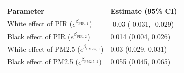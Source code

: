 \begin{table}[ht]
\centering
\begin{tabular}{ll}
  \hline
Parameter & Estimate (95\% CI) \\ 
  \hline
White effect of PIR ($e^{\beta_{\text{PIR, 1}}}$) & -0.03 (-0.031, -0.029) \\ 
  Black effect of PIR ($e^{\beta_{\text{PIR, 2}}}$) & 0.014 (0.004, 0.026) \\ 
  White effect of PM2.5 ($e^{\beta_{\text{PM2.5, 1}}}$) & 0.03 (0.029, 0.031) \\ 
  Black effect of PM2.5 ($e^{\beta_{\text{PM2.5, 2}}}$) & 0.055 (0.045, 0.065) \\ 
   \hline
\end{tabular}
\end{table}
